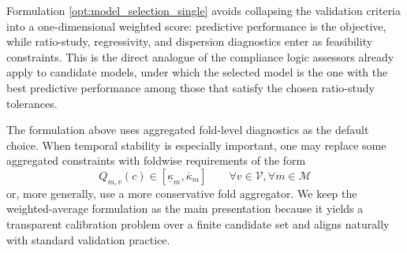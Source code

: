 \documentclass{article}
\theoremstyle{plain}
\theoremstyle{definition}
\newcommand{\1}{\mathbf{1}}
\begin{document}
Formulation \eqref{opt:model_selection_single} avoids collapsing the validation criteria into a one-dimensional weighted score: predictive performance is the objective, while ratio-study, regressivity, and dispersion diagnostics enter as feasibility constraints. This is the direct analogue of the compliance logic assessors already apply to candidate models, under which the selected model is the one with the best predictive performance among those that satisfy the chosen ratio-study tolerances.


The formulation above uses aggregated fold-level diagnostics as the default choice. When temporal stability is especially important, one may replace some aggregated constraints with foldwise requirements of the form
\[
Q_{m,v}(c)\in[\underline{\kappa}_m,\overline{\kappa}_m]
\qquad
\forall v\in\mathcal V, \forall m \in \mathcal M
\]
or, more generally, use a more conservative fold aggregator. We keep the weighted-average formulation as the main presentation because it yields a transparent calibration problem over a finite candidate set and aligns naturally with standard validation practice.
\end{document}
